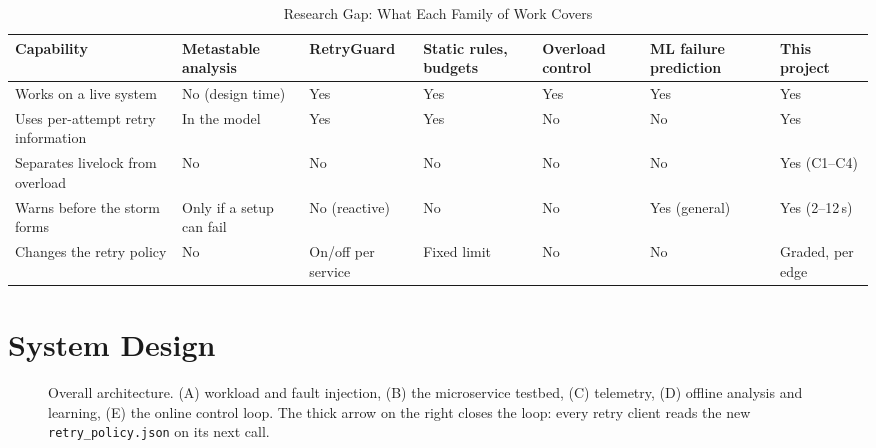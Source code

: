 \documentclass[conference,a4paper]{IEEEtran}
\begin{document}
\begin{table}[!t]
\caption{Research Gap: What Each Family of Work Covers}
\label{tab:gap}
\centering
\small
\setlength{\tabcolsep}{4pt}
\begin{tabular}{|L{3.7cm}|L{1.85cm}|L{1.75cm}|L{1.75cm}|L{1.85cm}|L{2.0cm}|L{1.9cm}|}
\hline
\textbf{Capability} & \textbf{Metastable analysis \cite{isaacs2025,haeberlen2025,alvaro2025,farahbakhsh2026}} & \textbf{RetryGuard \cite{retryguard2025}} & \textbf{Static rules, budgets \cite{brooker2019}} & \textbf{Overload control \cite{breakwater2020,topfull2024,rajomon2025}} & \textbf{ML failure prediction \cite{seer2019,firm2020,sage2021,ltfp2026,li2026}} & \textbf{This project} \\ \hline
Works on a live system & No (design time) & Yes & Yes & Yes & Yes & Yes \\ \hline
Uses per-attempt retry information & In the model & Yes & Yes & No & No & Yes \\ \hline
Separates livelock from overload & No & No & No & No & No & Yes (C1--C4) \\ \hline
Warns before the storm forms & Only if a setup can fail & No (reactive) & No & No & Yes (general) & Yes (2--12\,s) \\ \hline
Changes the retry policy & No & On/off per service & Fixed limit & No & No & Graded, per edge \\ \hline
\end{tabular}
\end{table}

\section{System Design}
\label{sec:design}

\begin{figure}[!t]
\centering
\resizebox{\textwidth}{!}{}
\caption{Overall architecture. (A) workload and fault injection, (B) the microservice testbed, (C) telemetry, (D) offline analysis and learning, (E) the online control loop. The thick arrow on the right closes the loop: every retry client reads the new \texttt{retry\_policy.json} on its next call.}
\label{fig:arch}
\end{figure}
\end{document}
